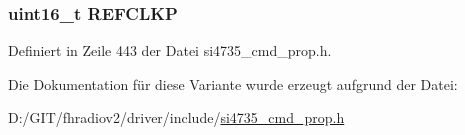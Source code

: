 \subsubsection[{R\+E\+F\+C\+L\+K\+P}]{\setlength{\rightskip}{0pt plus 5cm}uint16\+\_\+t R\+E\+F\+C\+L\+K\+P}\label{unionrefclk__pre_a546b4baeb928274149bafc12e1b720ff}


Definiert in Zeile 443 der Datei si4735\+\_\+cmd\+\_\+prop.\+h.



Die Dokumentation für diese Variante wurde erzeugt aufgrund der Datei\+:\begin{DoxyCompactItemize}
\item 
D\+:/\+G\+I\+T/fhradiov2/driver/include/\hyperlink{si4735__cmd__prop_8h}{si4735\+\_\+cmd\+\_\+prop.\+h}\end{DoxyCompactItemize}
